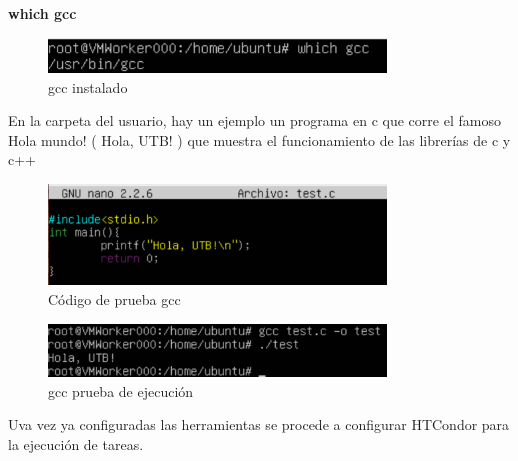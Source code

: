 \textbf{which gcc}

\begin{figure}[h]
\centering
\includegraphics[width=0.8\textwidth]{Figures/gccok.png}
\decoRule
\caption{gcc instalado}
\label{fig:GCC ready}
\end{figure}
\FloatBarrier

En la carpeta del usuario, hay un ejemplo un programa en c que corre el famoso Hola mundo! ( Hola, UTB! ) que muestra el funcionamiento de las librerías de c y c++

\begin{figure}[h]
\centering
\includegraphics[width=0.8\textwidth]{Figures/pruebagcc.png}
\decoRule
\caption{Código de prueba gcc}
\label{fig:GCC program}
\end{figure}
\FloatBarrier

\begin{figure}[h]
\centering
\includegraphics[width=0.8\textwidth]{Figures/testgccok.png}
\decoRule
\caption{gcc prueba de ejecución}
\label{fig:GCC test ok}
\end{figure}
\FloatBarrier

Uva vez ya configuradas las herramientas se procede a configurar HTCondor para la ejecución de tareas.
